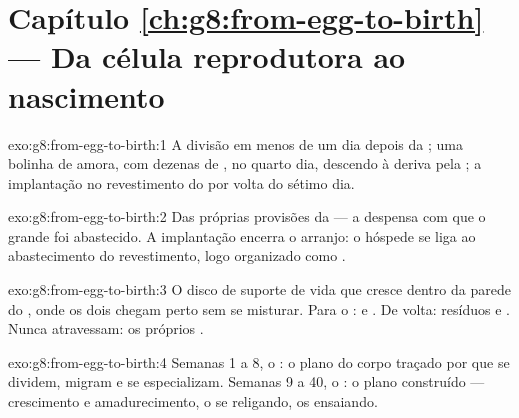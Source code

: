 \section*{Capítulo \ref{ch:g8:from-egg-to-birth} --- Da célula reprodutora ao nascimento}

\begin{solution}{exo:g8:from-egg-to-birth:1}
A divisão em menos de um dia depois da ; uma bolinha de
amora, com dezenas de , no quarto dia, descendo à deriva pela
; a implantação no revestimento do  por volta do
sétimo dia.
\end{solution}

\begin{solution}{exo:g8:from-egg-to-birth:2}
Das próprias provisões da  --- a despensa
com que o  grande foi abastecido. A implantação encerra o
arranjo: o hóspede se liga ao abastecimento do revestimento, logo
organizado como .
\end{solution}

\begin{solution}{exo:g8:from-egg-to-birth:3}
O disco de suporte de vida que cresce dentro da parede do , onde
os dois  chegam perto sem se misturar. Para o :
 e . De volta: resíduos e . Nunca
atravessam: os próprios .
\end{solution}

\begin{solution}{exo:g8:from-egg-to-birth:4}
Semanas 1 a 8, o : o plano do corpo traçado por  que se
dividem, migram e se especializam. Semanas 9 a 40, o : o plano
construído --- crescimento e amadurecimento, o  se religando, os
 ensaiando.
\end{solution}

